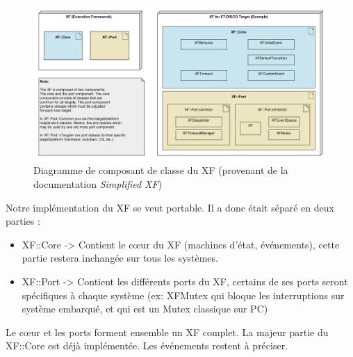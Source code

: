\begin{figure}[H]
    \centering
    \includegraphics[width=\textwidth]{Images/xf/comp-simple-xf.png}
    \caption[Diagramme de composant de classe du XF]{Diagramme de composant de classe du XF 
        (provenant de la documentation \emph{Simplified XF}\footnotemark)}
\end{figure}
Notre implémentation du XF se veut portable. Il a donc était séparé en deux parties :
\begin{itemize}
    \item XF::Core -> Contient le cœur du XF (machines d'état, événements), 
            cette partie restera inchangée sur tous les systèmes.
    \item XF::Port -> Contient les différents ports du XF, certains de ses ports
            seront spécifiques à chaque système (ex: XFMutex qui bloque les interruptions 
            sur système embarqué, et qui est un Mutex classique sur PC)
\end{itemize}
Le cœur et les ports forment ensemble un XF complet.
La majeur partie du XF::Core est déjà implémentée. Les événements restent à préciser.